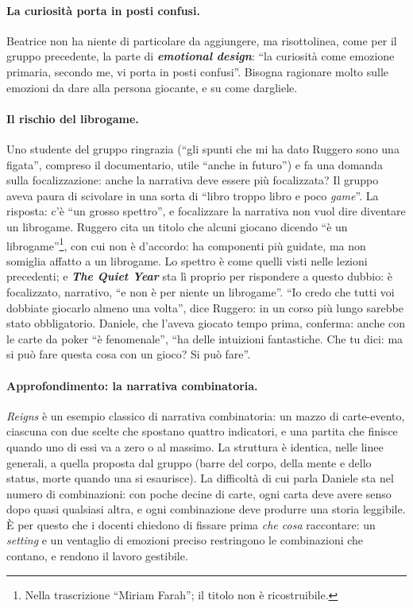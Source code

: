 \paragraph{La curiosità porta in posti confusi.} Beatrice non ha niente di particolare
da aggiungere, ma risottolinea, come per il gruppo precedente, la parte di
\textbf{\emph{emotional design}}: ``la curiosità come emozione primaria, secondo me, vi
porta in posti confusi''. Bisogna ragionare molto sulle emozioni da dare alla persona
giocante, e su come dargliele.

\paragraph{Il rischio del librogame.} Uno studente del gruppo ringrazia (``gli spunti che
mi ha dato Ruggero sono una figata'', compreso il documentario, utile ``anche in futuro'')
e fa una domanda sulla focalizzazione: anche la narrativa deve essere più focalizzata? Il
gruppo aveva paura di scivolare in una sorta di ``libro troppo libro e poco
\emph{game}''. La risposta: c'è ``un grosso spettro'', e focalizzare la narrativa non vuol
dire diventare un librogame. Ruggero cita un titolo che alcuni giocano dicendo ``è un
librogame''\footnote{Nella trascrizione ``Miriam Farah''; il titolo non è
ricostruibile.}, con cui non è d'accordo: ha componenti più guidate, ma non somiglia
affatto a un librogame. Lo spettro è come quelli visti nelle lezioni precedenti; e
\textbf{\emph{The Quiet Year}} sta lì proprio per rispondere a questo dubbio: è
focalizzato, narrativo, ``e non è per niente un librogame''. ``Io credo che tutti voi
dobbiate giocarlo almeno una volta'', dice Ruggero: in un corso più lungo sarebbe stato
obbligatorio. Daniele, che l'aveva giocato tempo prima, conferma: anche con le carte da
poker ``è fenomenale'', ``ha delle intuizioni fantastiche. Che tu dici: ma si può fare
questa cosa con un gioco? Si può fare''.

\paragraph{Approfondimento: la narrativa combinatoria.} \emph{Reigns} è un esempio
classico di narrativa combinatoria: un mazzo di carte-evento, ciascuna con due scelte che
spostano quattro indicatori, e una partita che finisce quando uno di essi va a zero o al
massimo. La struttura è identica, nelle linee generali, a quella proposta dal gruppo
(barre del corpo, della mente e dello status, morte quando una si esaurisce). La
difficoltà di cui parla Daniele sta nel numero di combinazioni: con poche decine di
carte, ogni carta deve avere senso dopo quasi qualsiasi altra, e ogni combinazione
deve produrre una storia leggibile. È per questo che i docenti chiedono di fissare
prima \emph{che cosa} raccontare: un \emph{setting} e un ventaglio di emozioni
preciso restringono le combinazioni che contano, e rendono il lavoro gestibile.

